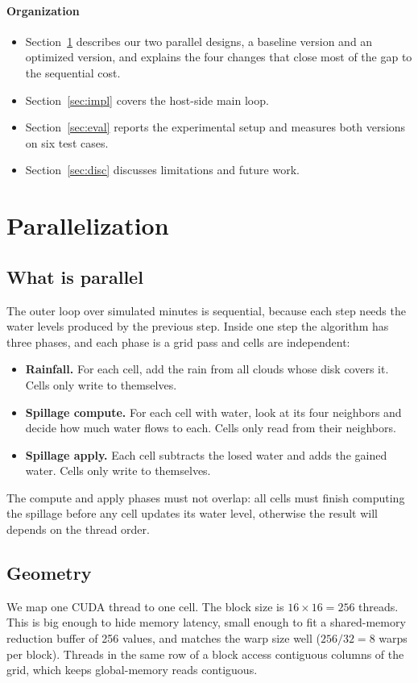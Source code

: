 \documentclass[sigconf, nonacm, review]{acmart}
\begin{document}
\paragraph{Organization}
\begin{itemize}
  \item Section~\ref{sec:par} describes our two parallel designs, a
    baseline version and an optimized version, and explains the four
    changes that close most of the gap to the sequential cost.
  \item Section~\ref{sec:impl} covers the host-side main loop.
  \item Section~\ref{sec:eval} reports the experimental setup and
    measures both versions on six test cases.
  \item Section~\ref{sec:disc} discusses limitations and future work.
\end{itemize}

\section{Parallelization}\label{sec:par}

\subsection{What is parallel}
The outer loop over simulated minutes is sequential, because each
step needs the water levels produced by the previous step. Inside
one step the algorithm has three phases, and each phase is a grid
pass and cells are independent:

\begin{itemize}
  \item \textbf{Rainfall.} For each cell, add the rain from all clouds
    whose disk covers it. Cells only write to themselves.
  \item \textbf{Spillage compute.} For each cell with water, look at
    its four neighbors and decide how much water flows to each. Cells
    only read from their neighbors.
  \item \textbf{Spillage apply.} Each cell subtracts the losed water
    and adds the gained water. Cells only write to themselves.
\end{itemize}

The compute and apply phases must not overlap: all cells must
finish computing the spillage before any cell updates its water
level, otherwise the result will depends on the thread order.

\subsection{Geometry}
We map one CUDA thread to one cell. The block size is
$16 \times 16 = 256$ threads. This is big enough to hide memory
latency, small enough to fit a shared-memory reduction buffer of
256 values, and matches the warp size well ($256 / 32 = 8$ warps
per block). Threads in the same row of a block access contiguous
columns of the grid, which keeps global-memory reads contiguous.
\end{document}
